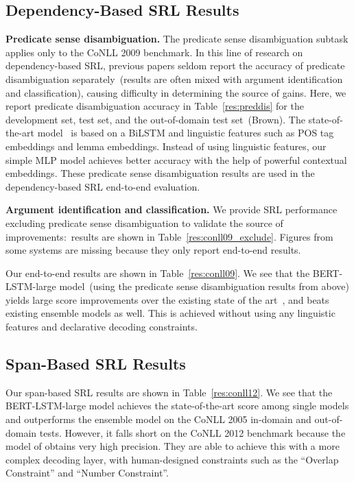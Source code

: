 \documentclass[11pt,a4paper]{article}
\begin{document}
\subsection{Dependency-Based SRL Results}


\noindent \textbf{Predicate sense disambiguation.} 
The predicate sense disambiguation subtask applies only to the CoNLL 2009 benchmark.
In this line of research on dependency-based SRL, previous papers seldom report the accuracy of predicate disambiguation separately~(results are often mixed with argument identification and classification), causing difficulty in determining the source of gains. 
Here, we report predicate disambiguation accuracy in Table~\ref{res:preddis} for the development set, test set, and the out-of-domain test set~(Brown). 
The state-of-the-art model~\cite{he2018syntax} is based on a BiLSTM and linguistic features such as POS tag embeddings and lemma embeddings. 
Instead of using linguistic features, our simple MLP model achieves better accuracy with the help of powerful contextual embeddings. 
These predicate sense disambiguation results are used in the dependency-based SRL end-to-end evaluation.

\smallskip \noindent \textbf{Argument identification and classification.} 
We provide SRL performance excluding predicate sense disambiguation to validate the source of improvements:\ results are shown in Table~\ref{res:conll09_exclude}.
Figures from some systems are missing because they only report end-to-end results.

Our end-to-end results are shown in Table~\ref{res:conll09}.
We see that the BERT-LSTM-large model~(using the predicate sense disambiguation results from above) yields large  score improvements over the existing state of the art~\cite{li2019dependency}, and beats existing ensemble models as well.
This is achieved without using any linguistic features and declarative decoding constraints.


\subsection{Span-Based SRL Results}

Our span-based SRL results are shown in Table~\ref{res:conll12}. 
We see that the BERT-LSTM-large model achieves the state-of-the-art  score among single models and outperforms the \citet{ouchi2018span} ensemble model on the CoNLL 2005 in-domain and out-of-domain tests. 
However, it falls short on the CoNLL 2012 benchmark because the model of \citet{ouchi2018span} obtains very high precision. 
They are able to achieve this with a more complex decoding layer, with human-designed constraints such as the ``Overlap Constraint'' and ``Number Constraint''.
\end{document}

